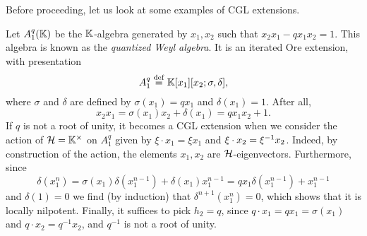 Before proceeding, let us look at some examples of CGL extensions.

\begin{example}
	Let $A_1^q(\mathbb{K})$ be the $\mathbb{K}$-algebra generated by $x_1, x_2$ such that $x_2 x_1 - q x_1 x_2 = 1$. This algebra is known as the \emph{quantized Weyl algebra}. It is an iterated Ore extension, with presentation
	\begin{equation*}
		A_1^q \overset{\mathrm{def}}{=} \mathbb{K}[x_1][x_2; \sigma, \delta],
	\end{equation*}
	where $\sigma$ and $\delta$ are defined by $\sigma(x_1) = q x_1$ and $\delta(x_1) = 1$.
	After all,
	\begin{equation*}
		x_2 x_1 = \sigma(x_1) x_2 + \delta(x_1) = q x_1 x_2 + 1.
	\end{equation*}
	If $q$ is not a root of unity, it becomes a CGL extension when we consider the action
	of $\mathcal{H} = \mathbb{K}^\times$ on $A_1^q$ given by $\xi \cdot x_1 = \xi x_1$ and $\xi \cdot
		x_2 = \xi^{-1} x_2$. Indeed, by construction of the action, the elements $x_1, x_2$ are
	$\mathcal{H}$-eigenvectors. Furthermore, since
	\begin{equation*}
		\delta(x_1^n) = \sigma(x_1)\delta(x_1^{n-1}) + \delta(x_1)x_1^{n-1} = q x_1 \delta(x_1^{n-1}) + x_1^{n-1}
	\end{equation*}
	and $\delta(1) = 0$ we find (by induction) that $\delta^{n+1}(x_1^n) = 0$, which shows
	that it is locally nilpotent. Finally, it suffices to pick $h_2 = q$, since $q \cdot
		x_1 = qx_1 = \sigma(x_1)$ and $q \cdot x_2 = q^{-1}x_2$, and $q^{-1}$ is not a root of
	unity.
\end{example}

